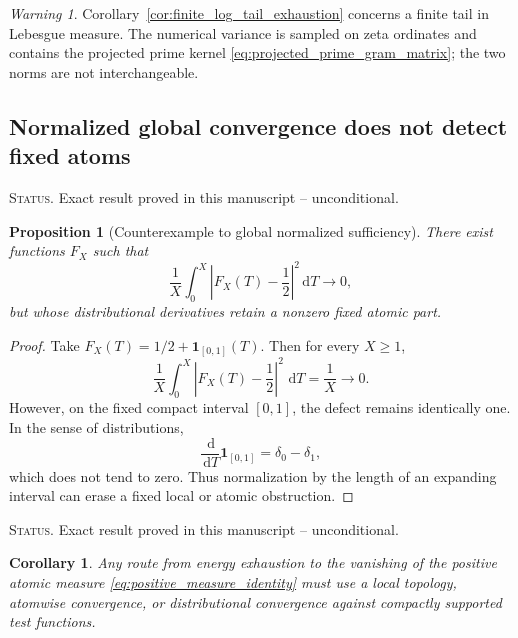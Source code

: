 \documentclass[11pt]{amsart}
\numberwithin{equation}{section}
\theoremstyle{plain}
\newtheorem{proposition}[theorem]{Proposition}
\newtheorem{corollary}[theorem]{Corollary}
\theoremstyle{definition}
\theoremstyle{remark}
\newtheorem{warning}[theorem]{Warning}
\newcommand{\1}{\mathbf{1}}
\newcommand{\dd}{\,\mathrm{d}}
\newcommand{\statusnote}[1]{%
  \par\smallskip\noindent
  \begingroup\footnotesize\textsc{Status.} #1\endgroup
  \par\smallskip}
\begin{document}
\begin{warning}
\label{warn:finite_tail_not_full_residual}
Corollary~\ref{cor:finite_log_tail_exhaustion} concerns a finite tail in
Lebesgue measure.  The numerical variance is sampled on zeta ordinates and
contains the projected prime kernel \eqref{eq:projected_prime_gram_matrix}; the two norms are
not interchangeable.
\end{warning}

\subsection{Normalized global convergence does not detect fixed atoms}
\label{subsec:global_not_local}

\statusnote{Exact result proved in this manuscript -- unconditional.}
\begin{proposition}[Counterexample to global normalized sufficiency]
\label{prop:global_normalized_counterexample}
There exist functions $F_X$ such that
\begin{equation}
\frac1X\int_0^X
\left|F_X(T)-\frac12\right|^2\dd T
\longrightarrow0,
\label{eq:global_normalized_convergence}
\end{equation}
but whose distributional derivatives retain a nonzero fixed atomic part.
\end{proposition}

\begin{proof}
Take \(F_X(T)=1/2+\1_{[0,1]}(T)\).  Then for every \(X\geq1\),
\begin{equation}
\frac1X\int_0^X\left|F_X(T)-\frac12\right|^2\,\dd T
=
\frac1X\longrightarrow0.
\label{eq:global_counterexample_mean}
\end{equation}
However, on the fixed compact interval \([0,1]\), the defect remains
identically one.  In the sense of distributions,
\begin{equation}
\frac{\dd}{\dd T}\1_{[0,1]}
=
\delta_0-\delta_1,
\label{eq:global_counterexample_derivative}
\end{equation}
which does not tend to zero.  Thus normalization by the length of an
expanding interval can erase a fixed local or atomic obstruction.
\end{proof}

\statusnote{Exact result proved in this manuscript -- unconditional.}
\begin{corollary}
\label{cor:local_topology_required}
Any route from energy exhaustion to the vanishing of the positive atomic
measure \eqref{eq:positive_measure_identity} must use a local topology,
atomwise convergence, or distributional convergence against compactly
supported test functions.
\end{corollary}
\end{document}
